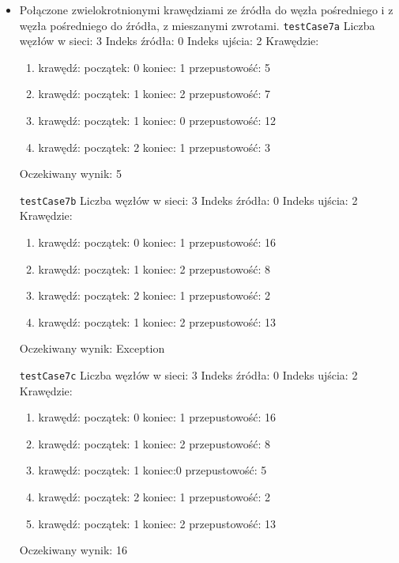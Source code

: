 \begin{itemize}[nosep]
    \item Połączone zwielokrotnionymi krawędziami ze źródła do węzła pośredniego
    i z węzła pośredniego do źródła, z mieszanymi zwrotami.
    \texttt{testCase7a}
    Liczba węzłów w sieci: 3
    Indeks źródła: 0
    Indeks ujścia: 2
    Krawędzie:
    \begin{enumerate}[nosep]
        \item krawędź:
        początek: 0
        koniec: 1
        przepustowość: 5
        \item krawędź:
        początek: 1
        koniec: 2
        przepustowość: 7
        \item krawędź:
        początek: 1
        koniec: 0
        przepustowość: 12
        \item krawędź:
        początek: 2
        koniec: 1
        przepustowość: 3
    \end{enumerate}
    Oczekiwany wynik: 5

    \texttt{testCase7b}
    Liczba węzłów w sieci: 3
    Indeks źródła: 0
    Indeks ujścia: 2
    Krawędzie:
    \begin{enumerate}[nosep]
        \item krawędź:
        początek: 0
        koniec: 1
        przepustowość: 16
        \item krawędź:
        początek: 1
        koniec: 2
        przepustowość: 8
        \item krawędź:
        początek: 2
        koniec: 1
        przepustowość: 2
        \item krawędź:
        początek: 1
        koniec: 2
        przepustowość: 13
    \end{enumerate}
    Oczekiwany wynik: Exception

    \texttt{testCase7c}
    Liczba węzłów w sieci: 3
    Indeks źródła: 0
    Indeks ujścia: 2
    Krawędzie:
    \begin{enumerate}[nosep]
        \item krawędź:
        początek: 0
        koniec: 1
        przepustowość: 16
        \item krawędź:
        początek: 1
        koniec: 2
        przepustowość: 8
        \item krawędź:
        początek: 1
        koniec:0
        przepustowość: 5
        \item krawędź:
        początek: 2
        koniec: 1
        przepustowość: 2
        \item krawędź:
        początek: 1
        koniec: 2
        przepustowość: 13
    \end{enumerate}
    Oczekiwany wynik: 16


\end{itemize}
